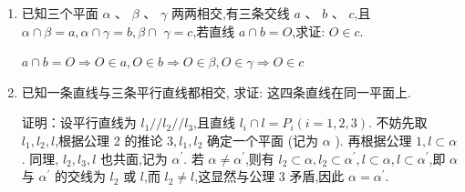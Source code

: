 \begin{enumerate}
\begin{jieda}
        根据公理3可知三点共线
    \end{jieda}
    \item 已知三个平面 $\alpha \text{ 、 }\beta \text{ 、 }\gamma$ 两两相交,有三条交线 $a\text{ 、 }b\text{ 、 }c$,且 $\alpha  \cap  \beta  = a,\alpha  \cap  \gamma  = b,\beta  \cap$  $\gamma  = c$,若直线 $a \cap  b = O$,求证: $O \in  c$.
    \begin{jieda}
        $a \cap  b = O \Longrightarrow O \in a, O \in b \Longrightarrow O \in \beta, O \in \gamma \Longrightarrow O \in c$
    \end{jieda}
    \item 已知一条直线与三条平行直线都相交, 求证: 这四条直线在同一平面上.
    \begin{jieda}
        证明：设平行直线为 ${l}_{1}//{l}_{2}//{l}_{3}$,且直线 ${l}_{i} \cap  l = {P}_{i}\left( {i = 1,2,3}\right)$. 不妨先取 ${l}_{1},{l}_{2},l$,根据公理 2 的推论 $3,{l}_{1},{l}_{2}$ 确定一个平面 (记为 $\alpha$ ). 再根据公理 $1,l \subset  \alpha$. 同理, ${l}_{2},{l}_{3},l$ 也共面,记为 ${\alpha }^{\prime }$. 若 $\alpha  \neq  {\alpha }^{\prime }$,则有 ${l}_{2} \subset  \alpha,{l}_{2} \subset  {\alpha }^{\prime },l \subset  \alpha,l \subset  {\alpha }^{\prime }$,即 $\alpha$ 与 ${\alpha }^{\prime }$ 的交线为 ${l}_{2}$ 或 $l$,而 ${l}_{2} \neq  l$,这显然与公理 3 矛盾,因此 $\alpha  = {\alpha }^{\prime }$.
    \end{jieda}
\end{enumerate}
